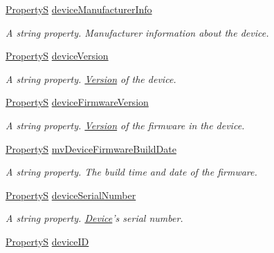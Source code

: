 \begin{DoxyCompactItemize}
\hyperlink{classmv_i_m_p_a_c_t_1_1acquire_1_1_property_s}{Property\+S} \hyperlink{classmv_i_m_p_a_c_t_1_1acquire_1_1_gen_i_cam_1_1_device_control_a0fb1fea197c3afdb2c0181b7724acd37}{device\+Manufacturer\+Info}
\begin{DoxyCompactList}\small\item\em A string property. Manufacturer information about the device. \end{DoxyCompactList}\item 
\hyperlink{classmv_i_m_p_a_c_t_1_1acquire_1_1_property_s}{Property\+S} \hyperlink{classmv_i_m_p_a_c_t_1_1acquire_1_1_gen_i_cam_1_1_device_control_a4149e3f594161773c8b1f825caa7ece8}{device\+Version}
\begin{DoxyCompactList}\small\item\em A string property. \hyperlink{struct_version}{Version} of the device. \end{DoxyCompactList}\item 
\hyperlink{classmv_i_m_p_a_c_t_1_1acquire_1_1_property_s}{Property\+S} \hyperlink{classmv_i_m_p_a_c_t_1_1acquire_1_1_gen_i_cam_1_1_device_control_a411bf0b0af1108fc95d2670a73c1387c}{device\+Firmware\+Version}
\begin{DoxyCompactList}\small\item\em A string property. \hyperlink{struct_version}{Version} of the firmware in the device. \end{DoxyCompactList}\item 
\hyperlink{classmv_i_m_p_a_c_t_1_1acquire_1_1_property_s}{Property\+S} \hyperlink{classmv_i_m_p_a_c_t_1_1acquire_1_1_gen_i_cam_1_1_device_control_a9b2853b6b68c5ce673c604bd260f61a0}{mv\+Device\+Firmware\+Build\+Date}
\begin{DoxyCompactList}\small\item\em A string property. The build time and date of the firmware. \end{DoxyCompactList}\item 
\hyperlink{classmv_i_m_p_a_c_t_1_1acquire_1_1_property_s}{Property\+S} \hyperlink{classmv_i_m_p_a_c_t_1_1acquire_1_1_gen_i_cam_1_1_device_control_ad310abaa033e92efb1cd1d6fa8f67444}{device\+Serial\+Number}
\begin{DoxyCompactList}\small\item\em A string property. \hyperlink{classmv_i_m_p_a_c_t_1_1acquire_1_1_device}{Device}'s serial number. \end{DoxyCompactList}\item 
\hyperlink{classmv_i_m_p_a_c_t_1_1acquire_1_1_property_s}{Property\+S} \hyperlink{classmv_i_m_p_a_c_t_1_1acquire_1_1_gen_i_cam_1_1_device_control_aadf1acdf754bef2f96225897e8982987}{device\+I\+D}

\end{DoxyCompactItemize}
